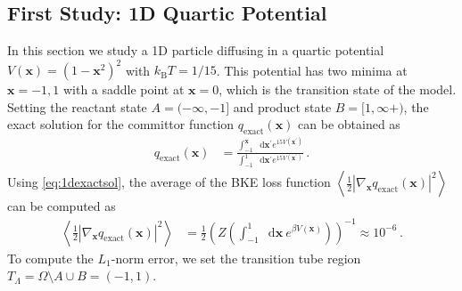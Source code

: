 \documentclass{article}
\numberwithin{equation}{section}
\def\*#1{\mathbf{#1}}
\newcommand*\diff{\mathop{}\!\mathrm{d}}
\theoremstyle{definition}
\theoremstyle{remark}
\begin{document}
\subsection{First Study: 1D Quartic Potential} \label{sec:1dbrownian}

In this section we study a 1D particle diffusing in a quartic potential $V(\* x)=(1-\* x^2)^2$ with $k_\mathrm{B} T=1/15$. 
This potential has two minima at $\* x=-1,1$ with a saddle point at $\* x=0$, which is the transition state of the model. 
Setting the reactant state $A=(-\infty,-1]$ and product state $B=[1,\infty+)$, the exact solution for the committor function $q_\mathrm{exact}(\* x)$ can be obtained as 
\begin{align}
q_\mathrm{exact}(\* x) &= \frac{\int_{-1}^{\* x} \diff \* x^\prime e^{15V(\* x^\prime)}}{\int_{-1}^1 \diff \* x^\prime e^{15 V (\* x^\prime)}} \label{eq:1dexactsol} \,.
\end{align}
Using \cref{eq:1dexactsol}, the average of the BKE loss function $\left\langle \frac{1}{2} |\nabla_{\* x} q_\mathrm{exact}(\* x) |^2\right\rangle$ can be computed as 
\begin{align}
\left\langle \frac{1}{2} |\nabla_{\* x}  q_\mathrm{exact}(\* x)|^2 \right\rangle &= \frac{1}{2}\left(Z \left(\int_{-1}^1 \diff \* x \ e^{\beta V(\* x)}\right)\right)^{-1} \!\! \!\! \!\! \approx  10^{-6} \,.  
\end{align}
To compute the $L_1$-norm error, we set the transition tube region $ T_{\Lambda}=\Omega \setminus A \cup B = (-1,1)$. 
\end{document}
